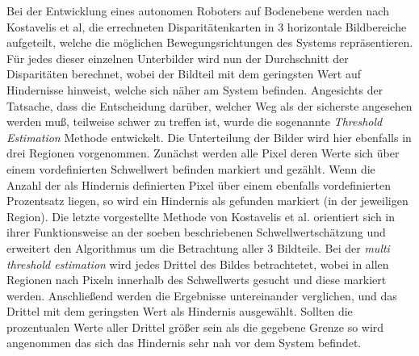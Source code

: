 \noindent
Bei der Entwicklung eines autonomen Roboters auf Bodenebene werden nach Kostavelis et al, \cite{kostavelis2010comparative} die errechneten Disparitätenkarten in 3 horizontale Bildbereiche aufgeteilt, welche die möglichen Bewegungsrichtungen des Systems repräsentieren. Für jedes dieser einzelnen Unterbilder wird nun der Durchschnitt der Disparitäten berechnet, wobei der Bildteil mit dem geringsten Wert auf Hindernisse hinweist, welche sich näher am System befinden. Angesichts der Tatsache, dass die Entscheidung darüber, welcher Weg als der sicherste angesehen werden muß, teilweise schwer zu treffen ist, wurde die sogenannte \emph{Threshold Estimation} Methode entwickelt. Die Unterteilung der Bilder wird hier ebenfalls in drei Regionen vorgenommen. Zunächst werden alle Pixel deren Werte sich über einem vordefinierten Schwellwert befinden markiert und gezählt. Wenn die Anzahl der als Hindernis definierten Pixel über einem ebenfalls vordefinierten Prozentsatz liegen, so wird ein Hindernis als gefunden markiert (in der jeweiligen Region). Die letzte vorgestellte Methode von Kostavelis et al. orientiert sich in ihrer Funktionsweise an der soeben beschriebenen Schwellwertschätzung und erweitert den Algorithmus um die Betrachtung aller 3 Bildteile. Bei der \emph{multi threshold estimation} wird jedes Drittel des Bildes betrachtetet, wobei in allen Regionen nach Pixeln innerhalb des Schwellwerts gesucht und diese markiert werden. Anschließend werden die Ergebnisse untereinander verglichen, und das Drittel mit dem geringsten Wert als Hindernis ausgewählt. Sollten die prozentualen Werte aller Drittel größer sein als die gegebene Grenze so wird angenommen das sich das Hindernis sehr nah vor dem System befindet.\\

